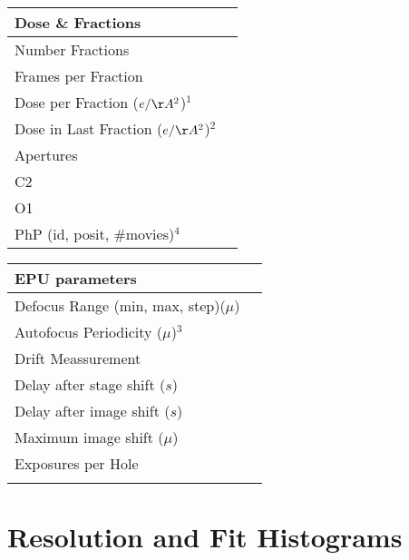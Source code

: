 \documentclass[12pt,a4paper]{article}
\begin{document}
\begin{tabulary}{\linewidth}{L L}
  \\\hline
  Dose \& Fractions &  \\\hline
  Number Fractions & 
       \\\hline
  Frames per Fraction & 
      \\\hline
  Dose per Fraction ($e/\AA^2$)$^1$&
       \\\hline
  Dose in Last Fraction ($e/\AA^2$)$^2$ &
       \\\hline
  Apertures &  \\\hline
  C2  &  \\\hline
  O1  &  \\\hline
  PhP (id, posit, \#movies)$^4$ &  \\\hline
\end{tabulary}
%
  \hspace{1cm}
%
\begin{tabulary}{\linewidth}{L p{3cm}}
  \\\hline
  EPU parameters &  \\\hline
  Defocus Range (min, max, step)($\mu$)&  \\\hline
  Autofocus Periodicity ($\mu$)$^3$ &
       \\\hline
  Drift Meassurement  &
       \\\hline %
  Delay after stage shift ($s$) & 
       \\\hline
  Delay after image shift ($s$) &
       \\\hline
  Maximum image shift ($\mu$) &
       \\\hline
  Exposures per Hole&
       \\\hline
      &\\
\end{tabulary}

\newpage
\section*{Resolution and Fit Histograms}
\end{document}
